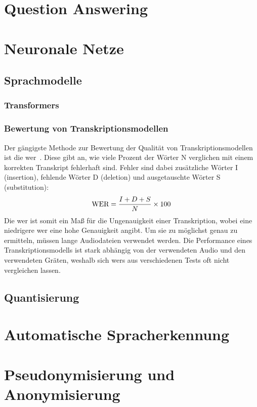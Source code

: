 
\section{Question Answering}

\section{Neuronale Netze}
\subsection{Sprachmodelle}
\subsubsection{Transformers}
\subsubsection{Bewertung von Transkriptionsmodellen}
Der gängigste Methode zur Bewertung der Qualität von Transkriptionsmodellen ist die \ac{wer}~\citep{wer}.
Diese gibt an, wie viele Prozent der Wörter N verglichen mit einem korrekten Transkript fehlerhaft sind.
Fehler sind dabei zusätzliche Wörter I (insertion), fehlende Wörter D (deletion) und ausgetauschte Wörter S (substitution):
\[\textnormal{WER} = \frac{I + D + S}{N} \times 100\]
Die \ac{wer} ist somit ein Maß für die Ungenauigkeit einer Transkription, wobei eine niedrigere \ac{wer} eine hohe Genauigkeit angibt.
Um sie zu möglichst genau zu ermitteln, müssen lange Audiodateien verwendet werden.
Die Performance eines Transkriptionsmodells ist stark abhängig von der verwendeten Audio und den verwendeten Gräten, weshalb sich \acp{wer} aus verschiedenen Tests oft nicht vergleichen lassen.

\subsection{Quantisierung}

\section{Automatische Spracherkennung}

\section{Pseudonymisierung und Anonymisierung}
